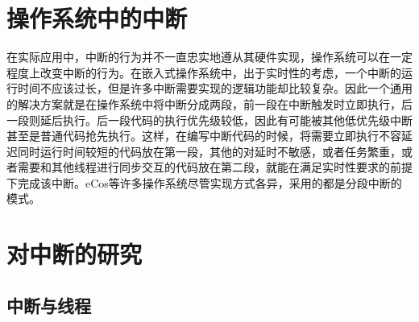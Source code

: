 \section{操作系统中的中断}
在实际应用中，中断的行为并不一直忠实地遵从其硬件实现，操作系统可以在一定程度上改变中断的行为。在嵌入式操作系统中，出于实时性的考虑，一个中断的运行时间不应该过长，但是许多中断需要实现的逻辑功能却比较复杂。因此一个通用的解决方案就是在操作系统中将中断分成两段，前一段在中断触发时立即执行，后一段则延后执行。后一段代码的执行优先级较低，因此有可能被其他低优先级中断甚至是普通代码抢先执行。这样，在编写中断代码的时候，将需要立即执行不容延迟同时运行时间较短的代码放在第一段，其他的对延时不敏感，或者任务繁重，或者需要和其他线程进行同步交互的代码放在第二段，就能在满足实时性要求的前提下完成该中断。eCos等许多操作系统尽管实现方式各异，采用的都是分段中断的模式。\cite{ecos}

\section{对中断的研究}


\subsection{中断与线程}